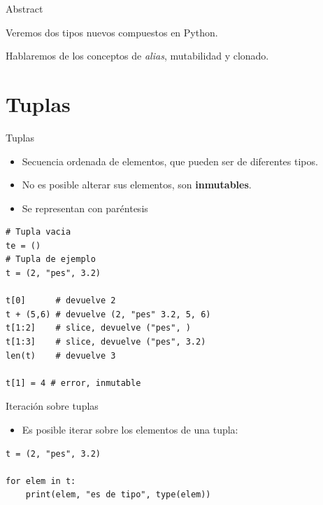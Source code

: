 \documentclass[mathserif]{beamer}
\subtitle{%
  \bfseries{Tuplas y listas: mutabilidad y clonado}\\%
}
\begin{document}


\begin{frame}{Abstract}
    
	\begin{blurb}
		Veremos dos tipos nuevos {\blue compuestos} en Python.
		
		Hablaremos de los conceptos de \textit{alias}, mutabilidad y clonado.
		
	\end{blurb}
\end{frame}

\section{Tuplas}

\begin{frame}[fragile]{Tuplas}
    \begin{itemize}
        \item Secuencia {\blue ordenada} de elementos, que pueden ser de diferentes {\blue tipos}.
        \item No es posible alterar sus elementos, son {\bfseries\orange inmutables}.
        \item Se representan con paréntesis
    \end{itemize}
\begin{lstlisting}
# Tupla vacia
te = ()
# Tupla de ejemplo
t = (2, "pes", 3.2)

t[0]      # devuelve 2
t + (5,6) # devuelve (2, "pes" 3.2, 5, 6)
t[1:2]    # slice, devuelve ("pes", )
t[1:3]    # slice, devuelve ("pes", 3.2)
len(t)    # devuelve 3

t[1] = 4 # error, inmutable
\end{lstlisting}
\end{frame}


\begin{frame}[fragile]{Iteración sobre tuplas}
    \begin{itemize}
        \item Es posible {\blue iterar} sobre los elementos de una tupla:
    \end{itemize}
\begin{lstlisting}
t = (2, "pes", 3.2)

for elem in t: 
    print(elem, "es de tipo", type(elem))
\end{lstlisting}
\end{frame}
\end{document}
